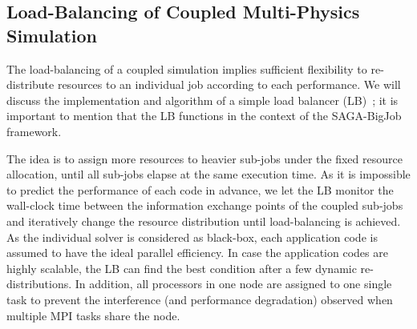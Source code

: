 \documentclass[preprint,12pt]{elsarticle}
\newcommand{\skonote}[1]{ {\textcolor{green} { ***Jeff: #1 }}}
\newcommand{\skonote}[1]{}
\begin{document}
\subsection{Load-Balancing of Coupled Multi-Physics Simulation}
The load-balancing of a coupled simulation implies sufficient flexibility to re-distribute resources to an individual job according to each performance. We will discuss the implementation and algorithm of a simple load balancer (LB)~\cite{Ko}; it is important to mention that the LB functions in the context of the SAGA-BigJob framework.

The idea is to assign more resources to heavier sub-jobs under the fixed resource allocation, until all sub-jobs elapse at the same execution time. As it is impossible to predict the performance of each code in advance, we let the LB monitor the wall-clock time between the information exchange points of the coupled sub-jobs and iteratively change the resource distribution until load-balancing is achieved. As the individual solver is considered as black-box, each application code is assumed to have the ideal parallel efficiency. In case the application codes are highly scalable, the LB can find the best condition after a few dynamic re-distributions. In addition, all processors in one node are assigned to one single task to prevent the interference (and performance degradation) observed when multiple MPI tasks share the node.


\end{document}
